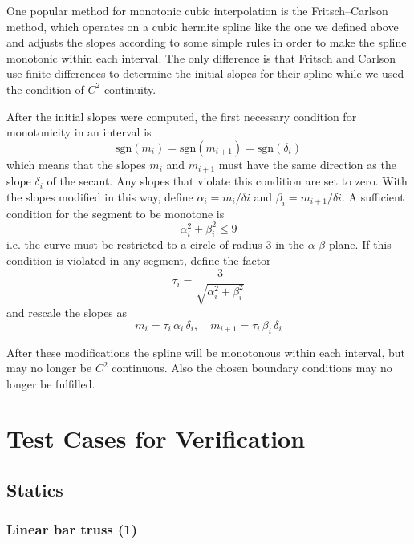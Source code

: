 One popular method for monotonic cubic interpolation is the Fritsch–Carlson method\cite{bib:fc80}, which operates on a cubic hermite spline like the one we defined above and adjusts the slopes according to some simple rules in order to make the spline monotonic within each interval.
The only difference is that Fritsch and Carlson use finite differences to determine the initial slopes for their spline while we used the condition of $C^2$ continuity.

After the initial slopes were computed, the first necessary condition for monotonicity in an interval is
%
\begin{equation}
\mathrm{sgn}(m_{i}) = \mathrm{sgn}(m_{i+1}) = \mathrm{sgn}(\delta_{i})
\end{equation}
%
which means that the slopes $m_{i}$ and $m_{i+1}$ must have the same direction as the slope $\delta_{i}$ of the secant.
Any slopes that violate this condition are set to zero.
With the slopes modified in this way, define $\alpha_{i} = m_{i}/\delta{i}$ and $\beta_{i} = m_{i+1}/\delta{i}$.
A sufficient condition for the segment to be monotone is
%
\begin{equation}
\alpha_{i}^2 + \beta_{i}^2 \le 9
\end{equation}
%
i.e. the curve must be restricted to a circle of radius $3$ in the $\alpha$-$\beta$-plane.
If this condition is violated in any segment, define the factor
%
\begin{equation}
\tau_{i} = \frac{3}{\sqrt{\alpha_{i}^2 + \beta_{i}^2}}
\end{equation}
%
and rescale the slopes as
%
\begin{equation}
m_{i} = \tau_{i}\,\alpha_{i}\,\delta_{i},\quad m_{i+1} = \tau_{i}\,\beta_{i}\,\delta_{i}
\end{equation}

After these modifications the spline will be monotonous within each interval, but may no longer be $C^2$ continuous.
Also the chosen boundary conditions may no longer be fulfilled.

\newpage
\chapter{Test Cases for Verification}

\section{Statics}

\subsection*{Linear bar truss (1)}

